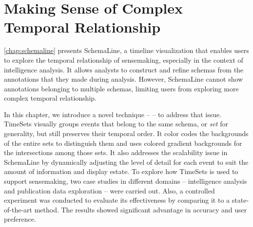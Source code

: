 \chapter{Making Sense of Complex Temporal Relationship}
\label{chap:timesets}

\graphicspath{{Chapter4/figures/}}

\autoref{chap:schemaline} presents SchemaLine, a timeline visualization that enables users to explore the temporal relationship of sensemaking, especially in the context of intelligence analysis. It allows analysts to construct and refine schemas from the annotations that they made during analysis. However, SchemaLine cannot show annotations belonging to multiple schemas, limiting users from exploring more complex temporal relationship. 

In this chapter, we introduce a novel technique -- \emph{} -- to address that issue. TimeSets visually groups events that belong to the same schema, or \emph{set} for generality, but still preserves their temporal order. It color codes the backgrounds of the entire sets to distinguish them and uses colored gradient backgrounds for the intersections among those sets. It also addresses the scalability issue in SchemaLine by dynamically adjusting the level of detail for each event to suit the amount of information and display estate. To explore how TimeSets is used to support sensemaking, two case studies in different domains -- intelligence analysis and publication data exploration -- were carried out. Also, a controlled experiment was conducted to evaluate its effectiveness by comparing it to a state-of-the-art method. The results showed significant advantage in accuracy and user preference.








